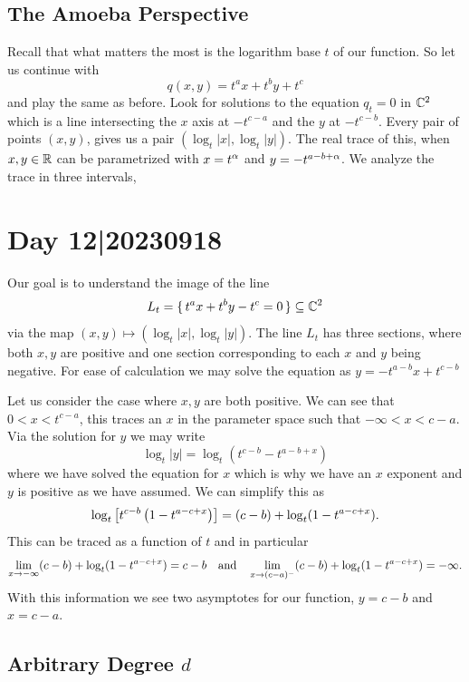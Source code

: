 \documentclass[12pt]{memoir}
\begin{document}
\subsection{The Amoeba Perspective}

Recall that what matters the most is the logarithm base $t$ of our function. So let us continue with 
$$q(x,y)=t^ax+t^by+t^c$$
and play the same as before. Look for solutions to the equation $q_t=0$ in $\mathbb{C}^2$ which is a line intersecting the $x$ axis at $-t^{c-a}$ and the $y$ at $-t^{c-b}$. Every pair of points $(x,y)$, gives us a pair $(\log_t|x|,\log_t|y|)$. The real trace of this, when $x,y\in\mathbb{R}$ can be parametrized with $x=t^\alpha$ and $y=-t^{a-b+\alpha}$. We analyze the trace in three intervals, 

\section{Day 12|20230918}

Our goal is to understand the image of the line 
$$L_t=\{\,t^ax+t^by-t^c=0\,\}\subseteq\mathbb{C}^2$$
via the map $(x,y)\mapsto (\log_t|x|,\log_t|y|)$. The line $L_t$ has three sections, where both $x,y$ are positive and one section corresponding to each $x$ and $y$ being negative. For ease of calculation we may solve the equation as $y=-t^{a-b}x+t^{c-b}$\par 
Let us consider the case where $x,y$ are both positive. We can see that $0<x<t^{c-a}$, this traces an $x$ in the parameter space such that $-\infty<x<c-a$. Via the solution for $y$ we may write 
$$\log_t|y|=\log_t(t^{c-b}-t^{a-b+x})$$
where we have solved the equation for $x$ which is why we have an $x$ exponent and $y$ is positive as we have assumed. We can simplify this as 
$$\log_t\left\lbrack t^{c-b}\left(1-t^{a-c+x}\right)\right\rbrack=(c-b)+\log_t(1-t^{a-c+x}).$$
This can be traced as a function of $t$ and in particular
$$\lim_{x\to-\infty}(c-b)+\log_t(1-t^{a-c+x})=c-b\quad\text{and}\quad\lim_{x\to(c-a)^{-}}(c-b)+\log_t(1-t^{a-c+x})=-\infty.$$
With this information we see two asymptotes for our function, $y=c-b$ and $x=c-a$.

\subsection{Arbitrary Degree $d$}
\end{document}
